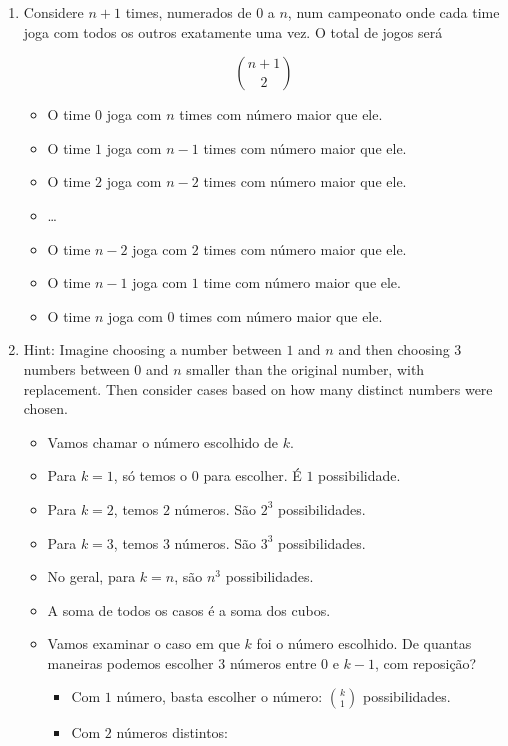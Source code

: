 \documentclass[
  11pt]{report}
\begin{document}
\begin{enumerate}
\def\labelenumi{\alph{enumi}.}
\item
  Considere $n + 1$ times, numerados de $0$ a $n$, num campeonato onde cada time joga com todos os outros exatamente uma vez. O total de jogos será

  \[
  \binom{n+1}{2}
  \]

  \begin{itemize}
  \item
    O time $0$ joga com $n$ times com número maior que ele.
  \item
    O time $1$ joga com $n - 1$ times com número maior que ele.
  \item
    O time $2$ joga com $n - 2$ times com número maior que ele.
  \item
    \ldots{}
  \item
    O time $n-2$ joga com $2$ times com número maior que ele.
  \item
    O time $n-1$ joga com $1$ time com número maior que ele.
  \item
    O time $n$ joga com $0$ times com número maior que ele.
  \end{itemize}
\item
  Hint: Imagine choosing a number between $1$ and $n$ and then choosing $3$ numbers between $0$ and $n$ smaller than the original number, with replacement. Then consider cases based on how many distinct numbers were chosen.

  \begin{itemize}
  \item
    Vamos chamar o número escolhido de $k$.
  \item
    Para $k = 1$, só temos o $0$ para escolher. É $1$ possibilidade.
  \item
    Para $k = 2$, temos $2$ números. São $2^3$ possibilidades.
  \item
    Para $k = 3$, temos $3$ números. São $3^3$ possibilidades.
  \item
    No geral, para $k = n$, são $n^3$ possibilidades.
  \item
    A soma de todos os casos é a soma dos cubos.
  \item
    Vamos examinar o caso em que $k$ foi o número escolhido. De quantas maneiras podemos escolher $3$ números entre $0$ e $k-1$, com reposição?

    \begin{itemize}
    \item
      Com $1$ número, basta escolher o número: $\binom{k}{1}$ possibilidades.
    \item
      Com $2$ números distintos:


\end{itemize}
\end{itemize}
\end{enumerate}
\end{document}
